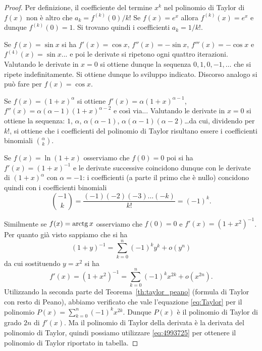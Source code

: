 %
\begin{proof}
\mymark{**}
Per definizione, il coefficiente del termine $x^k$
nel polinomio di Taylor di $f(x)$ non è altro che $a_k=f^{(k)}(0)/k!$
Se $f(x) = e^x$ allora $f^{(k)}(x) = e^x$ e dunque $f^{(k)}(0) = 1$. Si trovano quindi i coefficienti $a_k = 1/k!$.

Se $f(x) = \sin x$ si ha $f'(x)=\cos x$, $f''(x) =-\sin x$, $f'''(x) = -\cos x$ e $f^{(4)}(x) = \sin x$... e poi le derivate si ripetono ogni quattro iterazioni. Valutando le derivate in $x=0$ si ottiene dunque la sequenza $0, 1, 0, -1, \dots$ che si ripete indefinitamente. Si ottiene dunque lo sviluppo indicato. Discorso analogo si può fare per $f(x) = \cos x$.

Se $f(x) = (1+x)^\alpha$ si ottiene $f'(x) = \alpha (1+x)^{\alpha -1}$, $f''(x) = \alpha (\alpha -1) (1+x)^{\alpha -2}$ e così via...
Valutando le derivate in $x=0$ si ottiene la sequenza: $1$, $\alpha$, $\alpha(\alpha-1)$, $\alpha (\alpha-1)(\alpha -2)$\dots da cui, dividendo per $k!$, si ottiene che i coefficienti del polinomio di Taylor risultano essere i coefficienti binomiali ${\alpha \choose k}$.

Se $f(x) = \ln (1+x)$ osserviamo che $f(0)=0$ poi si ha $f'(x) = (1+x)^{-1}$ e le derivate successive coincidono dunque con le derivate di $(1+x)^\alpha$ con $\alpha=-1$: i coefficienti (a parte il primo che è nullo) concidono quindi con i coefficienti binomiali
\[
{-1 \choose k} = \frac{(-1)(-2)(-3) \dots (-k)}{k!} = (-1)^k.
\]

Similmente se $f(x) = \operatorname{arctg} x$ osserviamo che $f(0) = 0$ e $f'(x) = (1+x^2)^{-1}$. Per quanto già visto sappiamo che si ha
\[
 (1+y)^{-1} = \sum_{k=0}^n (-1)^k y^k + o(y^n)
\]
da cui sostituendo $y=x^2$ si ha
\[
 f'(x) = (1+x^2)^{-1} = \sum_{k=0}^n (-1)^k x^{2k} + o(x^{2n}).
\]
Utilizzando la seconda parte del Teorema~\ref{th:taylor_peano} (formula di Taylor con resto di Peano),
abbiamo verificato che vale l'equazione \eqref{eq:Taylor}
per il polinomio $P(x) = \sum_{k=0}^n (-1)^k x^{2k}$.
Dunque $P(x)$ è il polinomio di Taylor di grado $2n$ di $f'(x)$.
Ma il polinomio di Taylor della derivata è la derivata del polinomio
di Taylor, quindi possiamo utilizzare \eqref{eq:4993725} per ottenere
il polinomio di Taylor riportato in tabella.


\end{proof}
